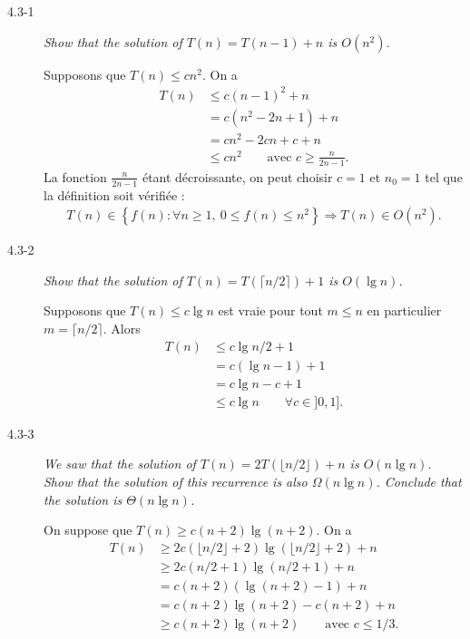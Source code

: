 \begin{description}
  \item[4.3-1] {\itshape Show that the solution of $T(n) = T(n-1) + n$ is $O(n^2)$.}

    \begin{ex}
      Supposons que $T(n) \le cn^2$. On a 
      \begin{align*}
        T(n) &\le c(n-1)^2 + n\\
        &= c(n^2-2n+1)+n\\
        &= cn^2 - 2cn + c + n\\
        &\le cn^2 \quad\quad \textrm{avec }c \ge \frac{n}{2n-1}.
      \end{align*}
      La fonction $\frac{n}{2n-1}$ \'etant d\'ecroissante, on peut choisir $c = 1$ et $n_0 = 1$ tel que la d\'efinition soit v\'erifi\'ee : 
      \begin{align*}
        T(n) \in \left\{ f(n) : \forall n \ge 1,~ 0 \le f(n) \le n^2 \right\}  \Longrightarrow T(n) \in O(n^2).
      \end{align*}

    \end{ex}

  \item[4.3-2] {\itshape Show that the solution of $T(n) = T(\lceil n/2 \rceil)+1$ is $O(\lg n)$.}

    \begin{ex}
      Supposons que $T(n) \le c\lg n$ est vraie pour tout $m \le n$ en particulier ${m = \lceil n/2 \rceil}$. Alors 
      \begin{align*}
        T(n) &\le c\lg n/2 + 1\\
        &= c(\lg n - 1) + 1\\
        &= c \lg n -c + 1\\
        &\le c\lg n \quad\quad \forall c \in ]0, 1].
      \end{align*}
    \end{ex}

  \item[4.3-3] {\itshape We saw that the solution of $T(n) = 2T(\lfloor n/2 \rfloor) + n$ is $O(n \lg n)$. Show that the solution of this recurrence is also $\Omega(n \lg n)$. Conclude that the solution is $\Theta(n \lg n)$.}
  \begin{ex} %
    On suppose que $T(n) \ge c(n+2)\lg(n+2)$. On a 
    \begin{align*}
      T(n) &\ge 2c(\lfloor n/2\rfloor+2)\lg(\lfloor n/2\rfloor+2) + n\\
        &\ge 2c(n/2+1)\lg(n/2+1)+n \\
        &= c(n+2)(\lg(n+2)-1)+n\\
        &= c(n+2)\lg(n+2)-c(n+2)+n\\
        &\ge c(n+2)\lg(n+2) \quad\quad \textrm{avec } c \le 1/3. 
    \end{align*}


\end{ex}
\end{description}
